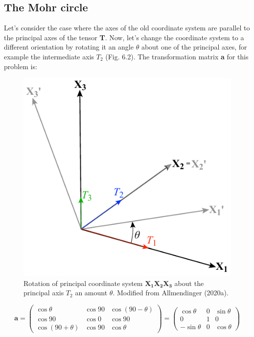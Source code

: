 \documentclass[a4paper , 12pt]{book}
\begin{document}
\subsection{The Mohr circle}\label{MohrCircle}

Let's consider the case where the axes of the old coordinate system are parallel to the principal axes of the tensor \textbf{T}. Now, let's change the coordinate system to a different orientation by rotating it an angle $\theta$ about one of the principal axes, for example the intermediate axis $T_2$ (Fig. 6.2). The transformation matrix \textbf{a} for this problem is:

\begin{figure}[ht]
    \centering
    \includegraphics{ch6f2.pdf}
    \caption{Rotation of principal coordinate system $\mathbf{X_1X_2X_3}$ about the principal axis $T_2$ an amount $\theta$. Modified from Allmendinger (2020a).}
\end{figure}

\begin{equation}
    \mathbf{a}=\begin{pmatrix}\cos\theta&\cos90&\cos(90-\theta)\\\cos90&\cos0&\cos90\\\cos(90+\theta)&\cos90&\cos\theta\end{pmatrix}=\begin{pmatrix}\cos\theta&0&\sin\theta\\0&1&0\\-\sin\theta&0&\cos\theta\end{pmatrix}
\end{equation}
\end{document}
